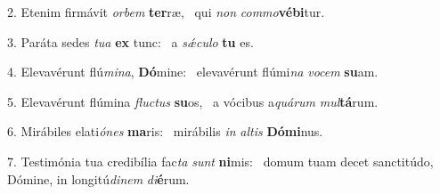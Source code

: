 2. Etenim firmávit \textit{or}\textit{bem} \textbf{ter}ræ, \ast\  qui \textit{non} \textit{com}\textit{mo}\textbf{vé}\textbf{bi}tur.\

3. Paráta sedes \textit{tu}\textit{a} \textbf{ex} tunc: \ast\  a \textit{sǽ}\textit{cu}\textit{lo} \textbf{tu} es.\

4. Elevavérunt flú\textit{mi}\textit{na}, \textbf{Dó}mine: \ast\  elevavérunt flúmi\textit{na} \textit{vo}\textit{cem} \textbf{su}am.\

5. Elevavérunt flúmina \textit{fluc}\textit{tus} \textbf{su}os, \ast\  a vócibus a\textit{quá}\textit{rum} \textit{mul}\textbf{tá}rum.\

6. Mirábiles elati\textit{ó}\textit{nes} \textbf{ma}ris: \ast\  mirábilis \textit{in} \textit{al}\textit{tis} \textbf{Dó}\textbf{mi}nus.\

7. Testimónia tua credibília fac\textit{ta} \textit{sunt} \textbf{ni}mis: \ast\  domum tuam decet sanctitúdo, Dómine, in longitú\textit{di}\textit{nem} \textit{di}\textbf{é}rum.\


